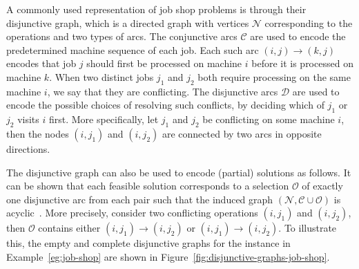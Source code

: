 \documentclass[a4paper]{report}
\theoremstyle{definition}
\theoremstyle{plain}
\begin{document}
A commonly used representation of job shop problems is through their disjunctive
graph, which is a directed graph with vertices $\mathcal{N}$ corresponding to the
operations and two types of arcs.
%
The conjunctive arcs $\mathcal{C}$ are used to encode the predetermined machine
sequence of each job. Each such arc $(i, j) \rightarrow (k, j)$ encodes that job
$j$ should first be processed on machine $i$ before it is processed on machine
$k$.
%
When two distinct jobs $j_{1}$ and $j_{2}$ both require processing on the same
machine $i$, we say that they are conflicting.
%
The disjunctive arcs $\mathcal{D}$ are used to encode the possible choices of
resolving such conflicts, by deciding which of $j_{1}$ or $j_{2}$ visits $i$
first.
%
More specifically, let $j_{1}$ and $j_{2}$ be conflicting on some machine $i$,
then the nodes $(i,j_{1})$ and $(i,j_{2})$ are connected by two arcs in opposite
directions.

The disjunctive graph can also be used to encode (partial) solutions as follows.
%
It can be shown that each feasible solution corresponds to a selection
$\mathcal{O}$ of exactly one disjunctive arc from each pair such that the
induced graph $(\mathcal{N}, \mathcal{C} \cup \mathcal{O})$ is
acyclic~\cite{pinedoSchedulingTheoryAlgorithms2016}.
%
More precisely, consider two conflicting operations $(i,j_{1})$ and $(i,j_{2})$,
then $\mathcal{O}$ contains either $(i,j_{1}) \rightarrow (i,j_{2})$ or
$(i,j_{1}) \rightarrow (i,j_{2})$.
%
To illustrate this, the empty and complete disjunctive graphs for the instance
in Example~\ref{eg:job-shop} are shown in Figure~\ref{fig:disjunctive-graphs-job-shop}.
\end{document}
